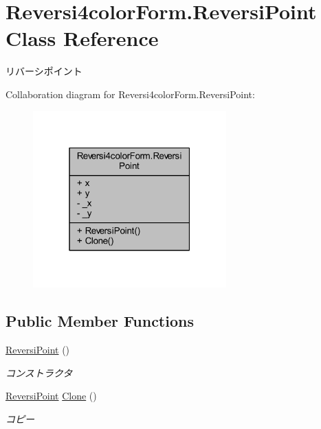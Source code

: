 \hypertarget{class_reversi4color_form_1_1_reversi_point}{}\section{Reversi4color\+Form.\+Reversi\+Point Class Reference}
\label{class_reversi4color_form_1_1_reversi_point}


リバーシポイント  




Collaboration diagram for Reversi4color\+Form.\+Reversi\+Point\+:
\nopagebreak
\begin{figure}[H]
\begin{center}
\leavevmode
\includegraphics[width=211pt]{class_reversi4color_form_1_1_reversi_point__coll__graph}
\end{center}
\end{figure}
\subsection*{Public Member Functions}
\begin{DoxyCompactItemize}
\item 
\hyperlink{class_reversi4color_form_1_1_reversi_point_a27174c0214cc9516f398f70a768d00fe}{Reversi\+Point} ()
\begin{DoxyCompactList}\small\item\em コンストラクタ \end{DoxyCompactList}\item 
\hyperlink{class_reversi4color_form_1_1_reversi_point}{Reversi\+Point} \hyperlink{class_reversi4color_form_1_1_reversi_point_a2f9e4db4dd43e27f9c957e5a221ca6f2}{Clone} ()
\begin{DoxyCompactList}\small\item\em コピー \end{DoxyCompactList}\end{DoxyCompactItemize}
